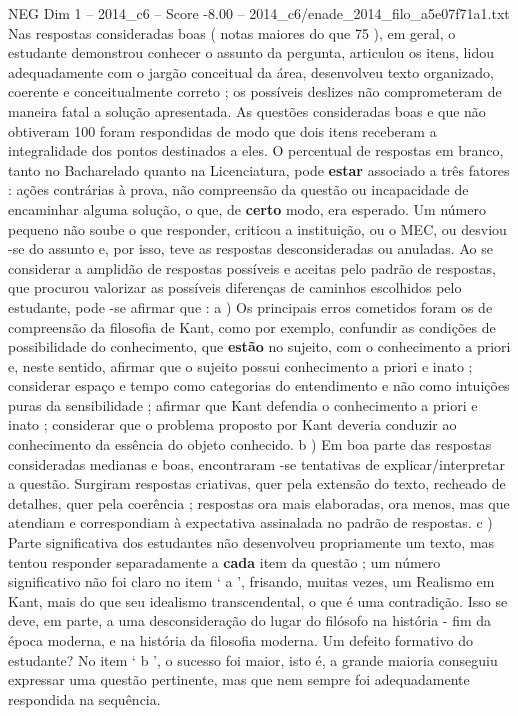 \begin{textsample}{NEG Dim 1 – 2014\_c6 – Score -8.00 – 2014\_c6/enade\_2014\_filo\_a5e07f71a1.txt}
Nas respostas consideradas boas ( notas maiores do que 75 ), em geral, o estudante demonstrou conhecer o assunto da pergunta, articulou os itens, lidou adequadamente com o jargão conceitual da área, desenvolveu texto organizado, coerente e conceitualmente correto ; os possíveis deslizes não comprometeram de maneira fatal a solução apresentada.
As questões consideradas boas e que não obtiveram 100 foram respondidas de modo que dois itens receberam a integralidade dos pontos destinados a eles.
O percentual de respostas em branco, tanto no Bacharelado quanto na Licenciatura, pode \textbf{estar} associado a três fatores : ações contrárias à prova, não compreensão da questão ou incapacidade de encaminhar alguma solução, o que, de \textbf{certo} modo, era esperado.
Um número pequeno não soube o que responder, criticou a instituição, ou o MEC, ou desviou -se do assunto e, por isso, teve as respostas desconsideradas ou anuladas.
Ao se considerar a amplidão de respostas possíveis e aceitas pelo padrão de respostas, que procurou valorizar as possíveis diferenças de caminhos escolhidos pelo estudante, pode -se afirmar que : a ) Os principais erros cometidos foram os de compreensão da filosofia de Kant, como por exemplo, confundir as condições de possibilidade do conhecimento, que \textbf{estão} no sujeito, com o conhecimento a priori e, neste sentido, afirmar que o sujeito possui conhecimento a priori e inato ; considerar espaço e tempo como categorias do entendimento e não como intuições puras da sensibilidade ; afirmar que Kant defendia o conhecimento a priori e inato ; considerar que o problema proposto por Kant deveria conduzir ao conhecimento da essência do objeto conhecido. b ) Em boa parte das respostas consideradas medianas e boas, encontraram -se tentativas de explicar/interpretar a questão.
Surgiram respostas criativas, quer pela extensão do texto, recheado de detalhes, quer pela coerência ; respostas ora mais elaboradas, ora menos, mas que atendiam e correspondiam à expectativa assinalada no padrão de respostas. c ) Parte significativa dos estudantes não desenvolveu propriamente um texto, mas tentou responder separadamente a \textbf{cada} item da questão ; um número significativo não foi claro no item ‘ a ’, frisando, muitas vezes, um Realismo em Kant, mais do que seu idealismo transcendental, o que é uma contradição.
Isso se deve, em parte, a uma desconsideração do lugar do filósofo na história - fim da época moderna, e na história da filosofia moderna.
Um defeito formativo do estudante?
No item ‘ b ’, o sucesso foi maior, isto é, a grande maioria conseguiu expressar uma questão pertinente, mas que nem sempre foi adequadamente respondida na sequência.

\end{textsample}
